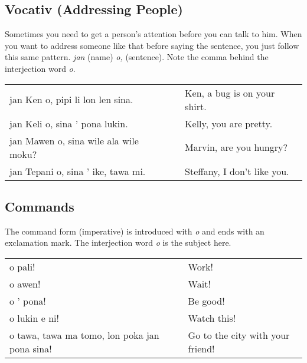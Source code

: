 \newpage
%
\subsection*{Vocativ (Addressing People)}
%
%
Sometimes you need to get a person's attention before you can talk to him. 
When you want to address someone like that before saying the sentence, you just follow this same pattern. 
\textit{jan} (name) \textit{o,} (sentence). 
Note the comma behind the interjection word \textit{o}. 

\begin{supertabular}{p{5,5cm}|ll}
jan Ken o, pipi li lon len sina. && Ken, a bug is on your shirt. \\
jan Keli o, sina ' pona lukin. && Kelly, you are pretty. \\
jan Mawen o, sina wile ala wile moku? && Marvin, are you hungry? \\
jan Tepani o, sina ' ike, tawa mi. && Steffany, I don't like you. \\
\end{supertabular} 
%
\subsection*{Commands}
%
%




The command form (imperative) is introduced with \textit{o} and ends with an exclamation mark.
The interjection word \textit{o} is the subject here.

\begin{supertabular}{p{5,5cm}|ll}
o pali! && Work! \\
o awen! && Wait! \\
o ' pona! && Be good! \\
o lukin e ni! && Watch this! \\
o tawa, tawa ma tomo, lon poka jan pona sina! && Go to the city with your friend! \\
\end{supertabular} 


